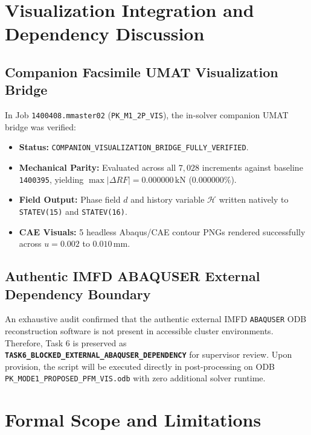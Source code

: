 \documentclass[11pt,a4paper]{report}
\begin{document}
\chapter{Visualization Integration and Dependency Discussion}
\label{chap:visualization}

\section{Companion Facsimile UMAT Visualization Bridge}
In Job \texttt{1400408.mmaster02} (\texttt{PK\_M1\_2P\_VIS}), the in-solver companion UMAT bridge was verified:
\begin{itemize}
    \item \textbf{Status:} \texttt{COMPANION\_VISUALIZATION\_BRIDGE\_FULLY\_VERIFIED}.
    \item \textbf{Mechanical Parity:} Evaluated across all $7{,}028$ increments against baseline \texttt{1400395}, yielding $\max |\Delta RF| = \mathbf{0.000000\,\mathrm{kN}}$ ($\mathbf{0.000000\%}$).
    \item \textbf{Field Output:} Phase field $d$ and history variable $\mathcal{H}$ written natively to \texttt{STATEV(15)} and \texttt{STATEV(16)}.
    \item \textbf{CAE Visuals:} 5 headless Abaqus/CAE contour PNGs rendered successfully across $u = 0.002$ to $0.010\,\mathrm{mm}$.
\end{itemize}

\section{Authentic IMFD ABAQUSER External Dependency Boundary}
An exhaustive audit confirmed that the authentic external IMFD \texttt{ABAQUSER} ODB reconstruction software \cite{roth2012} is not present in accessible cluster environments. Therefore, Task 6 is preserved as \textbf{\texttt{TASK6\_BLOCKED\_EXTERNAL\_ABAQUSER\_DEPENDENCY}} for supervisor review. Upon provision, the script will be executed directly in post-processing on ODB \texttt{PK\_MODE1\_PROPOSED\_PFM\_VIS.odb} with zero additional solver runtime.

\chapter{Formal Scope and Limitations}
\label{chap:limitations}
\end{document}
